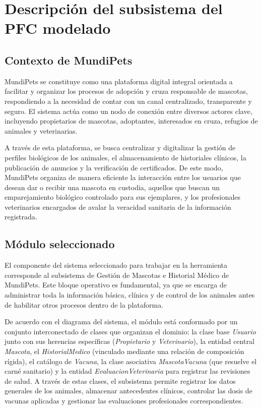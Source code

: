 \documentclass[journal,onecolumn]{IEEEtran}
\begin{document}
	\section{Descripción del subsistema del PFC modelado}
	
	\subsection{Contexto de MundiPets}
	MundiPets se constituye como una plataforma digital integral orientada a facilitar y organizar los procesos de adopción y cruza responsable de mascotas, respondiendo a la necesidad de contar con un canal centralizado, transparente y seguro. El sistema actúa como un nodo de conexión entre diversos actores clave, incluyendo propietarios de mascotas, adoptantes, interesados en cruza, refugios de animales y veterinarias.
	
	A través de esta plataforma, se busca centralizar y digitalizar la gestión de perfiles biológicos de los animales, el almacenamiento de historiales clínicos, la publicación de anuncios y la verificación de certificados. De este modo, MundiPets organiza de manera eficiente la interacción entre los usuarios que desean dar o recibir una mascota en custodia, aquellos que buscan un emparejamiento biológico controlado para sus ejemplares, y los profesionales veterinarios encargados de avalar la veracidad sanitaria de la información registrada.
	
	\subsection{Módulo seleccionado}
	El componente del sistema seleccionado para trabajar en la herramienta corresponde al subsistema de Gestión de Mascotas e Historial Médico de MundiPets. Este bloque operativo es fundamental, ya que se encarga de administrar toda la información básica, clínica y de control de los animales antes de habilitar otros procesos dentro de la plataforma.
	
	De acuerdo con el diagrama del sistema, el módulo está conformado por un conjunto interconectado de clases que organizan el dominio: la clase base \textit{Usuario} junto con sus herencias específicas (\textit{Propietario} y \textit{Veterinario}), la entidad central \textit{Mascota}, el \textit{HistorialMedico} (vinculado mediante una relación de composición rígida), el catálogo de \textit{Vacuna}, la clase asociativa \textit{MascotaVacuna} (que resuelve el carné sanitario) y la entidad \textit{EvaluacionVeterinaria} para registrar las revisiones de salud. A través de estas clases, el subsistema permite registrar los datos generales de los animales, almacenar antecedentes clínicos, controlar las dosis de vacunas aplicadas y gestionar las evaluaciones profesionales correspondientes.
	
\end{document}

